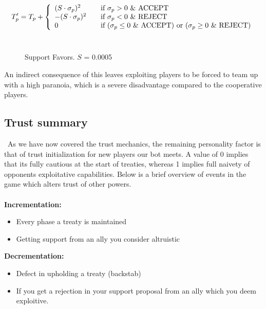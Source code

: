 \documentclass[a4paper]{article} %
\begin{document}
  \[ T'_p = T_p + \left\{ 
  \begin{array}{l l}
    (S \cdot \sigma_p)^2 & \quad \text{if $\sigma_p > 0$ \& ACCEPT}\\
    -(S \cdot \sigma_p)^2 & \quad \text{if $\sigma_p < 0$ \& REJECT}\\
    \text{0} & \quad \text{if ($\sigma_p \le 0$ \& ACCEPT) or ($\sigma_p \geq 0$ \& REJECT)}
    
  \end{array} \right.\]
  \\
\begin{figure}[H]
\centering
{}
\caption{Support Favors. $S$ = 0.0005}
\label{fig:graph3}
\end{figure}

An indirect consequence of this leaves exploiting players to be forced to team up with a high paranoia, which is a severe disadvantage compared to the cooperative players.

\subsection{Trust summary}
\
As we have now covered the trust mechanics, the remaining personality factor is that of trust initialization for new players our bot meets. A value of 0 implies that its fully cautious at the start of treaties, whereas 1 implies full naivety of opponents exploitative capabilities. Below is a brief overview of events in the game which alters trust of other powers.\\
\
\\
\textbf{Incrementation:}
\begin{itemize}
\item {Every phase a treaty is maintained}
\item {Getting support from an ally you consider altruistic}
\end{itemize}
\textbf{Decrementation:}
\begin{itemize}
\item{Defect in upholding a treaty (backstab)}
\item{If you get a rejection in your support proposal from an ally which you deem exploitive.}
\end{itemize}
\end{document}
